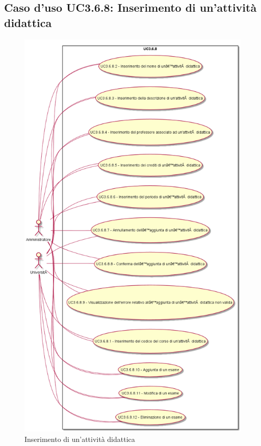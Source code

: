 \subsection{Caso d'uso \texorpdfstring{UC3.6.8}{UC3.6.8}: Inserimento di un'attività didattica}
\begin{figure} [H]
\centering
\includegraphics[scale=0.45]{./img/UC3-6-8.png}
\caption{Inserimento di un'attività didattica}\label{}
\end{figure}
